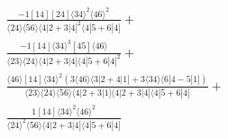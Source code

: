 \documentclass[varwidth, border=5pt]{standalone}
\begin{document}
\begin{my}
$\begin{gathered}
\scriptscriptstyle\frac{-1[14][24]⟨34⟩^2⟨46⟩^2}{⟨24⟩⟨56⟩⟨4|2+3|4]^2⟨4|5+6|4]}+\\
\scriptscriptstyle\frac{-1[14]⟨34⟩^3[45]⟨46⟩}{⟨23⟩⟨24⟩⟨4|2+3|4]⟨4|5+6|4]^2}+\\
\scriptscriptstyle\frac{⟨46⟩[14]⟨34⟩^2(3⟨46⟩⟨3|2+4|1]+3⟨34⟩⟨6|4-5|1])}{⟨23⟩⟨24⟩⟨56⟩⟨4|2+3|1]⟨4|2+3|4]⟨4|5+6|4]}+\\
\scriptscriptstyle\frac{1[14]⟨34⟩^2⟨46⟩^2}{⟨24⟩^2⟨56⟩⟨4|2+3|4]⟨4|5+6|4]}\phantom{+}
\end{gathered}$
\end{my}
\end{document}
